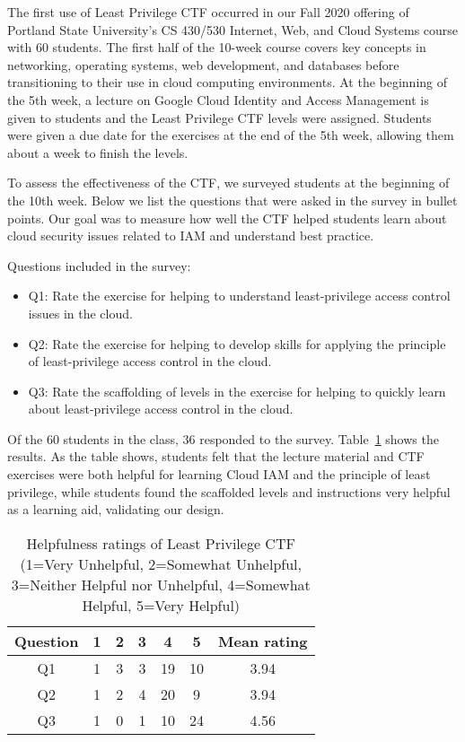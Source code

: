 \noindent The first use of Least Privilege CTF occurred in our Fall 2020 offering of Portland State University's CS 430/530 Internet, Web, and Cloud Systems course with 60 students.  The first half of the 10-week course covers key concepts in networking, operating systems, web development, and databases before transitioning to their use in cloud computing environments. At the beginning of the 5th week, a lecture on Google Cloud Identity and Access Management is given to students and the Least Privilege CTF levels were assigned. Students were given a due date for the exercises at the end of the 5th week, allowing them about a week to finish the levels.

To assess the effectiveness of the CTF, we surveyed students at the beginning of the 10th week. Below we list the questions that were asked in the survey in bullet points.  Our goal was to measure how well the CTF helped students learn about cloud security issues related to IAM and understand best practice.  

Questions included in the survey:
\begin{itemize}
\item Q1: Rate the exercise for helping to understand least-privilege access control issues in the cloud.
\item Q2: Rate the exercise for helping to develop skills for applying the principle of least-privilege access control in the cloud.
\item Q3: Rate the scaffolding of levels in the exercise for helping to quickly learn about least-privilege access control in the cloud.
\end{itemize}

Of the 60 students in the class, 36 responded to the survey.  Table~\ref{table:data} shows the results. As the table shows, students felt that the lecture material and CTF exercises were both helpful for learning Cloud IAM and the principle of least privilege, while students found the scaffolded levels and instructions very helpful as a learning aid, validating our design.

\begin{table}[h]
 \vspace{-0.20cm}
 \caption{Helpfulness ratings of Least Privilege CTF (1=Very Unhelpful, 2=Somewhat Unhelpful, 3=Neither Helpful nor Unhelpful, 4=Somewhat Helpful, 5=Very Helpful)}
    \label{table:data} \centering
    \begin{tabular}{|c|c|c|c|c|c|c|}
    \hline
    Question & 1 & 2 & 3 & 4 & 5 &Mean rating\\
    \hline
    \hline
    Q1 & 1 & 3 & 3 & 19 & 10 & 3.94\\ %
    \hline
    Q2 & 1 & 2 & 4 & 20 & 9 & 3.94\\ %
    \hline
    Q3 & 1 & 0 & 1 & 10 & 24 & 4.56\\ %
    \hline
    \end{tabular}
\end{table}